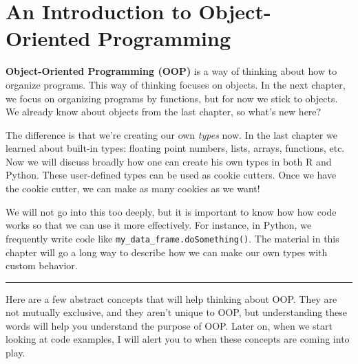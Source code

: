 \documentclass[12pt,krantz2]{krantz}
\begin{document}
\hypertarget{an-introduction-to-object-oriented-programming}{%
\chapter{An Introduction to Object-Oriented Programming}\label{an-introduction-to-object-oriented-programming}}

\textbf{Object-Oriented Programming (OOP)} is a way of thinking about how to organize programs. This way of thinking focuses on objects. In the next chapter, we focus on organizing programs by functions, but for now we stick to objects. We already know about objects from the last chapter, so what's new here?

The difference is that we're creating our own \emph{types} now. In the last chapter we learned about built-in types: floating point numbers, lists, arrays, functions, etc. Now we will discuss broadly how one can create his own types in both R and Python. These user-defined types can be used as cookie cutters. Once we have the cookie cutter, we can make as many cookies as we want!

We will not go into this too deeply, but it is important to know how how code works so that we can use it more effectively. For instance, in Python, we frequently write code like \texttt{my\_data\_frame.doSomething()}. The material in this chapter will go a long way to describe how we can make our own types with custom behavior.

\begin{center}\rule{0.5\linewidth}{0.5pt}\end{center}

Here are a few abstract concepts that will help thinking about OOP. They are not mutually exclusive, and they aren't unique to OOP, but understanding these words will help you understand the purpose of OOP. Later on, when we start looking at code examples, I will alert you to when these concepts are coming into play.
\end{document}

